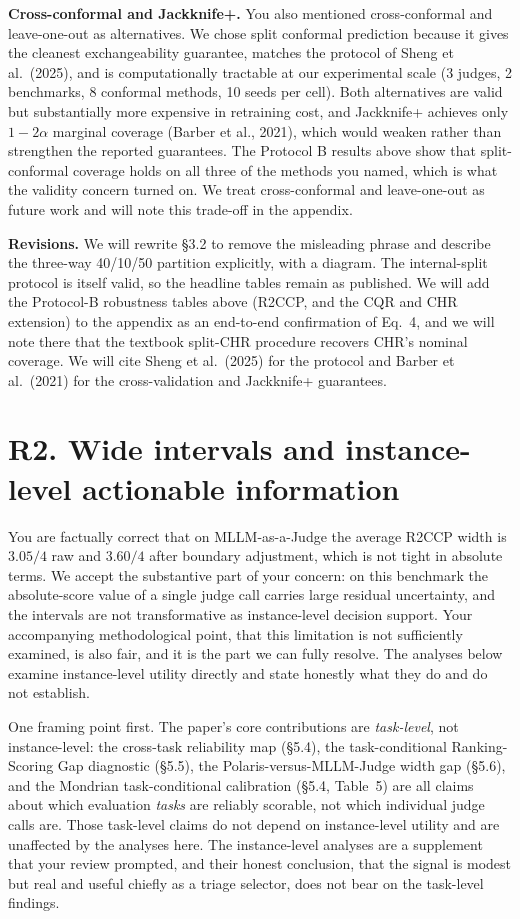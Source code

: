 \documentclass[11pt]{article}
\begin{document}
\textbf{Cross-conformal and Jackknife+.} You also mentioned cross-conformal and leave-one-out as alternatives. We chose split conformal prediction because it gives the cleanest exchangeability guarantee, matches the protocol of Sheng et al.\ (2025), and is computationally tractable at our experimental scale (3 judges, 2 benchmarks, 8 conformal methods, 10 seeds per cell). Both alternatives are valid but substantially more expensive in retraining cost, and Jackknife+ achieves only $1-2\alpha$ marginal coverage (Barber et al., 2021), which would weaken rather than strengthen the reported guarantees. The Protocol B results above show that split-conformal coverage holds on all three of the methods you named, which is what the validity concern turned on. We treat cross-conformal and leave-one-out as future work and will note this trade-off in the appendix.

\textbf{Revisions.} We will rewrite \S 3.2 to remove the misleading phrase and describe the three-way 40/10/50 partition explicitly, with a diagram. The internal-split protocol is itself valid, so the headline tables remain as published. We will add the Protocol-B robustness tables above (R2CCP, and the CQR and CHR extension) to the appendix as an end-to-end confirmation of Eq.\ 4, and we will note there that the textbook split-CHR procedure recovers CHR's nominal coverage. We will cite Sheng et al.\ (2025) for the protocol and Barber et al.\ (2021) for the cross-validation and Jackknife+ guarantees.

\section*{R2. Wide intervals and instance-level actionable information}

You are factually correct that on MLLM-as-a-Judge the average R2CCP width is $3.05/4$ raw and $3.60/4$ after boundary adjustment, which is not tight in absolute terms. We accept the substantive part of your concern: on this benchmark the absolute-score value of a single judge call carries large residual uncertainty, and the intervals are not transformative as instance-level decision support. Your accompanying methodological point, that this limitation is not sufficiently examined, is also fair, and it is the part we can fully resolve. The analyses below examine instance-level utility directly and state honestly what they do and do not establish.

One framing point first. The paper's core contributions are \emph{task-level}, not instance-level: the cross-task reliability map (\S 5.4), the task-conditional Ranking-Scoring Gap diagnostic (\S 5.5), the Polaris-versus-MLLM-Judge width gap (\S 5.6), and the Mondrian task-conditional calibration (\S 5.4, Table~5) are all claims about which evaluation \emph{tasks} are reliably scorable, not which individual judge calls are. Those task-level claims do not depend on instance-level utility and are unaffected by the analyses here. The instance-level analyses are a supplement that your review prompted, and their honest conclusion, that the signal is modest but real and useful chiefly as a triage selector, does not bear on the task-level findings.
\end{document}
